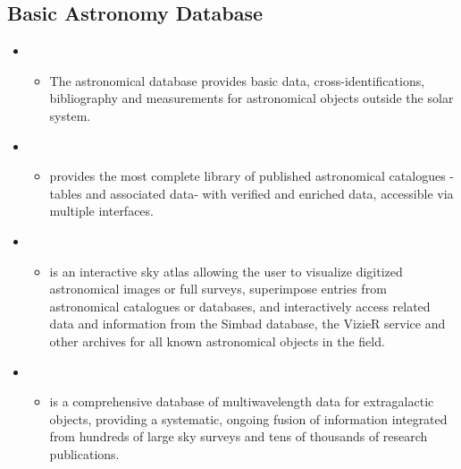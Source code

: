 \documentclass[letterpaper,10pt,english]{sphinxmanual}
\begin{document}
\subsection{Basic Astronomy Database}
\label{\detokenize{resource/astro/astro_research_basic:basic-astronomy-database}}\begin{itemize}
\item {} 
\begin{itemize}
\item {} 
The  astronomical database provides basic data,
cross-identifications, bibliography and measurements for
astronomical objects outside the solar system.

\end{itemize}

\item {} 
\begin{itemize}
\item {} 
 provides the most complete library of published
astronomical catalogues -tables and associated data- with verified
and enriched data, accessible via multiple interfaces.

\end{itemize}

\item {} 
\begin{itemize}
\item {} 
 is an interactive sky atlas allowing the user to
visualize digitized astronomical images or full surveys,
superimpose entries from astronomical catalogues or databases, and
interactively access related data and information from the Simbad
database, the VizieR service and other archives for all known
astronomical objects in the field.

\end{itemize}

\item {} 
\begin{itemize}
\item {} 
 is a comprehensive database of multiwavelength data for
extragalactic objects, providing a systematic, ongoing fusion of
information integrated from hundreds of large sky surveys and tens
of thousands of research publications.


\end{itemize}
\end{itemize}
\end{document}
